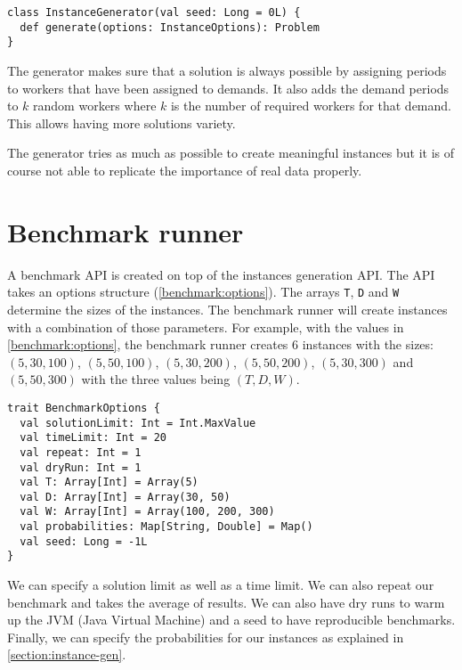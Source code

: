 \documentclass[../thesis.tex]{subfiles}
\begin{document}
  
\begin{lstlisting}[style=scalaStyle,caption={Instance generator API},captionpos=b]
class InstanceGenerator(val seed: Long = 0L) {
  def generate(options: InstanceOptions): Problem
}
\end{lstlisting}

The generator makes sure that a solution is always possible by assigning periods to workers 
that have been assigned to demands. It also adds the demand periods to $k$ random workers
where $k$ is the number of required workers for that demand. This allows having more solutions variety.
    
The generator tries as much as possible to create meaningful instances but it is of course not able to replicate the importance of real data properly.

\section{Benchmark runner}
\label{section:benchmark-runner}

A benchmark API is created on top of the instances generation API. The API takes an options structure (\autoref{benchmark:options}).
The arrays \texttt{T}, \texttt{D} and \texttt{W} determine the sizes of the instances. The benchmark runner 
will create instances with a combination of those parameters. For example, with the values in \autoref{benchmark:options},
the benchmark runner creates 6 instances with the sizes: $(5, 30, 100)$, $(5, 50, 100)$, $(5, 30, 200)$, $(5, 50, 200)$, $(5, 30, 300)$ and $(5, 50, 300)$ with the 
three values being $(T, D, W)$.

\begin{lstlisting}[style=scalaStyle,label={benchmark:options},caption={Benchmark options},captionpos=b]
trait BenchmarkOptions {
  val solutionLimit: Int = Int.MaxValue
  val timeLimit: Int = 20
  val repeat: Int = 1
  val dryRun: Int = 1
  val T: Array[Int] = Array(5)
  val D: Array[Int] = Array(30, 50)
  val W: Array[Int] = Array(100, 200, 300)
  val probabilities: Map[String, Double] = Map()
  val seed: Long = -1L
}
\end{lstlisting}

We can specify a solution limit as well as a time limit. We can also repeat our benchmark and takes 
the average of results. We can also have dry runs to warm up the JVM (Java Virtual Machine) and a seed to have reproducible benchmarks. Finally,
we can specify the probabilities for our instances as explained in \autoref{section:instance-gen}.
\end{document}
